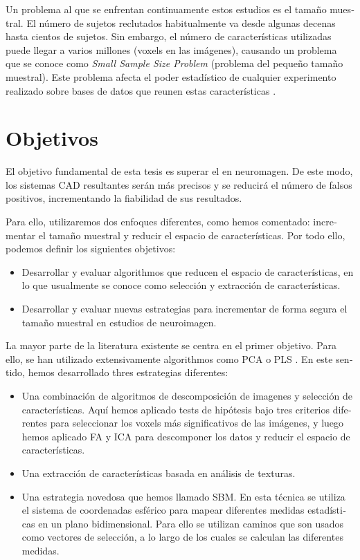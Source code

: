 \begin{otherlanguage}{spanish}
Un problema al que se enfrentan continuamente estos estudios es el tamaño muestral. El número de sujetos reclutados habitualmente va desde algunas decenas hasta cientos de sujetos. Sin embargo, el número de características utilizadas puede llegar a varios millones (voxels en las imágenes), causando un problema que se conoce como \emph{Small Sample Size Problem} \cite{Duin2000} (problema del pequeño tamaño muestral). Este problema afecta el poder estadístico de cualquier experimento realizado sobre bases de datos que reunen estas características \cite{Button2013}. 

\section*{Objetivos}
El objetivo fundamental de esta tesis es superar el  en neuromagen. De este modo, los sistemas \ac{CAD} resultantes serán más precisos y se reducirá el número de falsos positivos, incrementando la fiabilidad de sus resultados. 

Para ello, utilizaremos dos enfoques diferentes, como hemos comentado: incrementar el tamaño muestral y reducir el espacio de características. Por todo ello, podemos definir los siguientes objetivos: 

\begin{itemize}
	\item Desarrollar y evaluar algorithmos que reducen el espacio de características, en lo que usualmente se conoce como selección y extracción de características. 
	\item Desarrollar y evaluar nuevas estrategias para incrementar de forma segura el tamaño muestral en estudios de neuroimagen.  
\end{itemize}

La mayor parte de la literatura existente se centra en el primer objetivo. Para ello, se han utilizado extensivamente algorithmos como \acf{PCA} \cite{Khedher2015,Towey2011} o \acf{PLS} \cite{Segovia2013}. En este sentido, hemos desarrollado thres estrategias diferentes:

\begin{itemize}
	\item Una combinación de algoritmos de descomposición de imagenes y selección de características. Aquí hemos aplicado tests de hipótesis bajo tres criterios diferentes para seleccionar los voxels más significativos de las imágenes, y luego hemos aplicado \acf{FA} y \acf{ICA} para descomponer los datos y reducir el espacio de características. 
	\item Una extracción de características basada en análisis de texturas. 
	\item Una estrategia novedosa que hemos llamado \acf{SBM}. En esta técnica se utiliza el sistema de coordenadas esférico para mapear diferentes medidas estadísticas en un plano bidimensional. Para ello se utilizan caminos que son usados como vectores de selección, a lo largo de los cuales se calculan las diferentes medidas. 
\end{itemize}


\end{otherlanguage}
